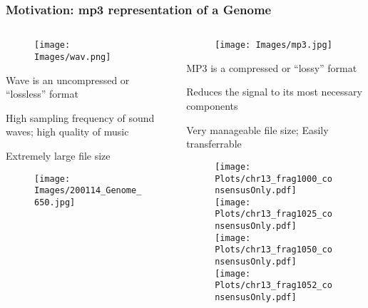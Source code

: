 \documentclass[10pt,dvipsnames,table]{beamer}
\begin{document}
\begin{frame}
\frametitle{Motivation: mp3 representation of a Genome}
\vspace{-0.5cm}
\begin{columns}[t]
\begin{column}{0.5\textwidth}
\vspace{-0.5cm}
\begin{figure}[t]
\texttt{[image: Images/wav.png]} 
\end{figure}

\vspace{-0.5cm}
\begin{itemize}
{\footnotesize{
\item Wave is an uncompressed or ``lossless'' format
\item High sampling frequency of sound waves; high quality of music
\item Extremely large file size
}}
\end{itemize}

\begin{figure}[H]
\texttt{[image: Images/200114\_Genome\_650.jpg]} 
\end{figure}

\end{column}

\begin{column}{0.5\textwidth}
\vspace{-0.5cm}
\begin{figure}[t]
\texttt{[image: Images/mp3.jpg]}
\end{figure}

\vspace{-0.5cm}
\begin{itemize}
{\footnotesize{
\item MP3 is a compressed or ``lossy'' format
\item Reduces the signal to its most necessary components
\item Very manageable file size; Easily transferrable
}}
\end{itemize}
\vspace{-0.5cm}
\begin{figure}[H]
\hspace{-1cm}
\texttt{[image: Plots/chr13\_frag1000\_consensusOnly.pdf]} \\
\vspace{-0.5cm} \hspace{0.5cm}
\texttt{[image: Plots/chr13\_frag1025\_consensusOnly.pdf]} \\
\vspace{-0.5cm} \hspace{-2cm}
\texttt{[image: Plots/chr13\_frag1050\_consensusOnly.pdf]} \\
\vspace{-0.5cm} \hspace{1cm}
\texttt{[image: Plots/chr13\_frag1052\_consensusOnly.pdf]} \\
\end{figure}


\end{column}
\end{columns}
\end{frame}
\end{document}
